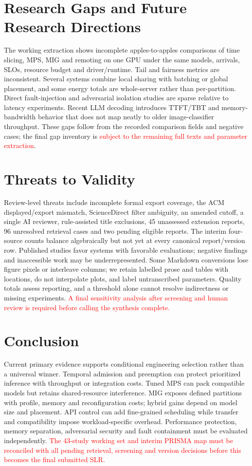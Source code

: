 \documentclass[12pt,a4paper]{article}
\newcommand{\red}[1]{\textcolor{red}{#1}}
\begin{document}
\section{Research Gaps and Future Research Directions}
The working extraction shows incomplete apples-to-apples comparisons of time slicing, MPS, MIG and remoting on one GPU under the same models, arrivals, SLOs, resource budget and driver/runtime. Tail and fairness metrics are inconsistent. Several systems combine local sharing with batching or global placement, and some energy totals are whole-server rather than per-partition. Direct fault-injection and adversarial isolation studies are sparse relative to latency experiments. Recent LLM decoding introduces TTFT/TBT and memory-bandwidth behavior that does not map neatly to older image-classifier throughput. These gaps follow from the recorded comparison fields and negative cases; the final gap inventory is \red{subject to the remaining full texts and parameter extraction}.

\section{Threats to Validity}
Review-level threats include incomplete formal export coverage, the ACM displayed/export mismatch, ScienceDirect filter ambiguity, an amended cutoff, a single AI reviewer, rule-assisted title exclusions, 45 unassessed extension reports, 96 unresolved retrieval cases and two pending eligible reports. The interim four-source counts balance algebraically but not yet at every canonical report/version row. Published studies favor systems with favorable evaluations; negative findings and inaccessible work may be underrepresented. Some Markdown conversions lose figure pixels or interleave columns; we retain labelled prose and tables with locations, do not interpolate plots, and label untranscribed parameters. Quality totals assess reporting, and a threshold alone cannot resolve indirectness or missing experiments. \red{A final sensitivity analysis after screening and human review is required before calling the synthesis complete.}

\section{Conclusion}
Current primary evidence supports conditional engineering selection rather than a universal winner. Temporal admission and preemption can protect prioritized inference with throughput or integration costs. Tuned MPS can pack compatible models but retains shared-resource interference. MIG exposes defined partitions with profile, memory and reconfiguration costs; hybrid gains depend on model size and placement. API control can add fine-grained scheduling while transfer and compatibility impose workload-specific overhead. Performance protection, memory separation, adversarial security and fault containment must be evaluated independently. \red{The 43-study working set and interim PRISMA map must be reconciled with all pending retrieval, screening and version decisions before this becomes the final submitted SLR.}
\end{document}
